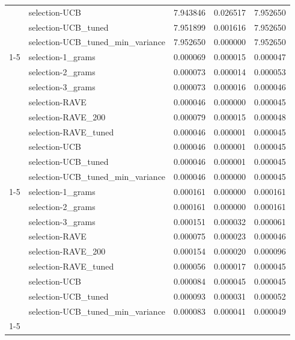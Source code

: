 \begin{tabular}{llrrr}
 & selection-UCB & 7.943846 & 0.026517 & 7.952650 \\
 & selection-UCB_tuned & 7.951899 & 0.001616 & 7.952650 \\
 & selection-UCB_tuned_min_variance & 7.952650 & 0.000000 & 7.952650 \\
\cline{1-5}
\multirow[t]{9}{*}{vqls_0} & selection-1_grams & 0.000069 & 0.000015 & 0.000047 \\
 & selection-2_grams & 0.000073 & 0.000014 & 0.000053 \\
 & selection-3_grams & 0.000073 & 0.000016 & 0.000046 \\
 & selection-RAVE & 0.000046 & 0.000000 & 0.000045 \\
 & selection-RAVE_200 & 0.000079 & 0.000015 & 0.000048 \\
 & selection-RAVE_tuned & 0.000046 & 0.000001 & 0.000045 \\
 & selection-UCB & 0.000046 & 0.000001 & 0.000045 \\
 & selection-UCB_tuned & 0.000046 & 0.000001 & 0.000045 \\
 & selection-UCB_tuned_min_variance & 0.000046 & 0.000000 & 0.000045 \\
\cline{1-5}
\multirow[t]{9}{*}{vqls_1} & selection-1_grams & 0.000161 & 0.000000 & 0.000161 \\
 & selection-2_grams & 0.000161 & 0.000000 & 0.000161 \\
 & selection-3_grams & 0.000151 & 0.000032 & 0.000061 \\
 & selection-RAVE & 0.000075 & 0.000023 & 0.000046 \\
 & selection-RAVE_200 & 0.000154 & 0.000020 & 0.000096 \\
 & selection-RAVE_tuned & 0.000056 & 0.000017 & 0.000045 \\
 & selection-UCB & 0.000084 & 0.000045 & 0.000045 \\
 & selection-UCB_tuned & 0.000093 & 0.000031 & 0.000052 \\
 & selection-UCB_tuned_min_variance & 0.000083 & 0.000041 & 0.000049 \\
\cline{1-5}
\bottomrule
\end{tabular}
